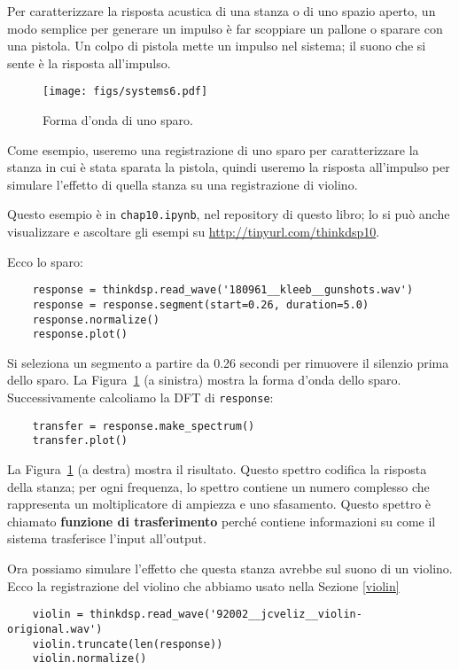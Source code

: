 \documentclass[12pt,a4paper]{book}
\begin{document}
Per caratterizzare la risposta acustica di una stanza o di uno spazio aperto, un modo semplice per generare un impulso è far scoppiare un pallone o sparare con una pistola. Un colpo di pistola mette un impulso nel sistema; il suono che si sente è la risposta all'impulso.

\begin{figure} 

\centerline{\texttt{[image: figs/systems6.pdf]}} \caption{Forma d'onda di uno sparo.} \label{fig.systems6} \end{figure} 

Come esempio, useremo una registrazione di uno sparo per caratterizzare la stanza in cui è stata sparata la pistola, quindi useremo la risposta all'impulso per simulare l'effetto di quella stanza su una registrazione di violino.

Questo esempio è in {\tt chap10.ipynb}, nel repository di questo libro; lo si può anche visualizzare e ascoltare gli esempi su \url{http://tinyurl.com/thinkdsp10}.

Ecco lo sparo:

\begin{verbatim} 
    response = thinkdsp.read_wave('180961__kleeb__gunshots.wav')
    response = response.segment(start=0.26, duration=5.0)
    response.normalize()
    response.plot()
 \end{verbatim} 

Si seleziona un segmento a partire da 0.26 secondi per rimuovere il silenzio prima dello sparo. La Figura~\ref{fig.systems6} (a sinistra) mostra la forma d'onda dello sparo. Successivamente calcoliamo la DFT di {\tt response}:

\begin{verbatim} 
    transfer = response.make_spectrum()
    transfer.plot()
 \end{verbatim} 

La Figura~\ref{fig.systems6} (a destra) mostra il risultato. Questo spettro codifica la risposta della stanza; per ogni frequenza, lo spettro contiene un numero complesso che rappresenta un moltiplicatore di ampiezza e uno sfasamento. Questo spettro è chiamato {\bf funzione di trasferimento} perché contiene informazioni su come il sistema trasferisce l'input all'output.

Ora possiamo simulare l'effetto che questa stanza avrebbe sul suono di un violino. Ecco la registrazione del violino che abbiamo usato nella Sezione \ref{violin} 

\begin{verbatim} 
    violin = thinkdsp.read_wave('92002__jcveliz__violin-origional.wav')
    violin.truncate(len(response))
    violin.normalize()
 \end{verbatim} 
\end{document}
